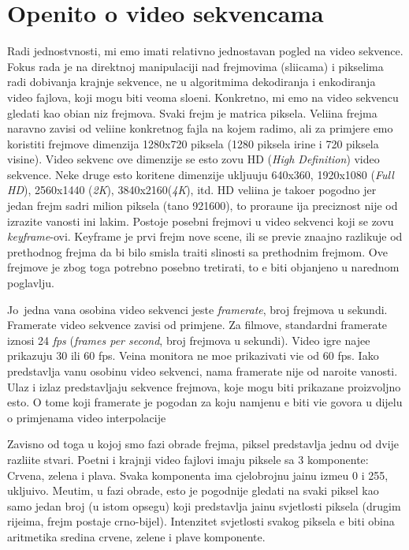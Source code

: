 \section{Op\cj enito o video sekvencama}
Radi jednostvnosti, mi \cj emo imati relativno jednostavan pogled na video sekvence. Fokus rada je na direktnoj manipulaciji nad frejmovima (sli\ch icama) i pikselima radi dobivanja krajnje sekvence, 
ne u algoritmima dekodiranja i enkodiranja video fajlova, koji mogu biti veoma slo\zh eni. Konkretno, mi \cj emo na video sekvencu gledati kao obi\ch an niz frejmova. Svaki frejm je matrica piksela. 
Veli\ch ina frejma naravno zavisi od veli\ch ine konkretnog fajla na kojem radimo, ali za primjere \cj emo koristiti frejmove dimenzija 1280x720 piksela (1280 piksela \sh irine i 720 piksela visine).
 Video sekvenc  ove dimenzije se \ch esto zovu HD (\textit{High Definition}) video sekvence. Neke druge \ch esto kori\sh tene dimenzije uklju\ch uju 640x360, 1920x1080 (\textit{Full HD}), 2560x1440 
 (\textit{2K}), 3840x2160(\textit{4K}), itd. HD veli\ch ina je tako\dj er pogodno jer jedan frejm sadr\zh i  milion piksela (ta\ch no 921600), \sh to prora\ch une \ch ija preciznost nije od izrazite 
 va\zh nosti \ch ini lak\sh im. Postoje posebni frejmovi u video sekvenci koji se zovu \textit{keyframe}-ovi. Keyframe je prvi frejm nove scene, ili se previ\sh e zna\ch ajno razlikuje od prethodnog
 frejma da bi bilo smisla tra\zh iti sli\ch nosti sa prethodnim frejmom. Ove frejmove je zbog toga potrebno posebno tretirati, \sh to \cj e biti obja\sh njeno u narednom poglavlju.
 
 Jo\sh\ jedna va\zh na osobina video sekvenci jeste \textit{framerate}, broj frejmova u sekundi. Framerate video sekvence zavisi od primjene. Za filmove, standardni framerate
iznosi 24 \textit{fps} (\textit{frames per second}, broj frejmova u sekundi). Video igre naj\ch e\sh \cj e prikazuju 30 ili 60 fps. Ve\cj ina monitora ne mo\zh e prikazivati vi\sh e od 60 fps. Iako predstavlja
va\zh nu osobinu video sekvenci, nama framerate nije od naro\ch ite va\zh nosti. Ulaz i izlaz predstavljaju sekvence frejmova, koje mogu biti prikazane proizvoljno \ch esto. O tome koji framerate
je pogodan za koju namjenu \cj e biti vi\sh e govora u dijelu o primjenama video interpolacije

Zavisno od toga u kojoj smo fazi obrade frejma, piksel predstavlja jednu od dvije razli\ch ite stvari. Po\ch etni i krajnji video fajlovi imaju piksele sa 3 komponente: Crvena, zelena i plava. Svaka 
komponenta ima cjelobrojnu ja\ch inu izme\dj u 0 i 255, uklju\ch ivo. Me\dj utim, u fazi obrade, \ch esto je pogodnije gledati na svaki piksel kao samo jedan broj (u istom opsegu) koji
predstavlja ja\ch inu svjetlosti piksela (drugim rije\ch ima, frejm postaje crno-bijel). Intenzitet svjetlosti svakog piksela \cj e biti obi\ch na aritmeti\ch ka sredina crvene, zelene i plave komponente.

